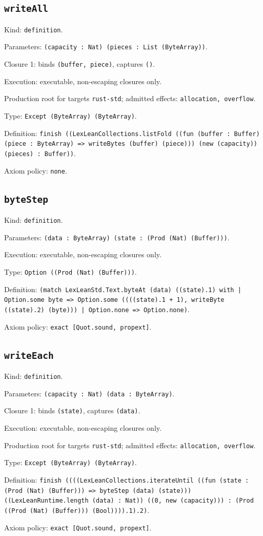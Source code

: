 \documentclass[11pt]{article}
\begin{document}
\subsection*{\texttt{writeAll}}
\noindent Kind: \texttt{definition}.\par
\noindent Parameters: \texttt{(capacity : Nat) (pieces : List (ByteArray))}.\par
\noindent Closure 1: binds \texttt{(buffer, piece)}, captures \texttt{()}.\par
\noindent Execution: executable, non-escaping closures only.\par
\noindent Production root for targets \texttt{rust-std}; admitted effects: \texttt{allocation, overflow}.\par
\noindent Type: \texttt{Except (ByteArray) (ByteArray)}.\par
\noindent Definition: \texttt{finish ((LexLeanCollections.listFold ((fun (buffer : Buffer) (piece : ByteArray) => writeBytes (buffer) (piece))) (new (capacity)) (pieces) : Buffer))}.\par
\noindent Axiom policy: \texttt{none}.\par
\subsection*{\texttt{byteStep}}
\noindent Kind: \texttt{definition}.\par
\noindent Parameters: \texttt{(data : ByteArray) (state : (Prod (Nat) (Buffer)))}.\par
\noindent Execution: executable, non-escaping closures only.\par
\noindent Type: \texttt{Option ((Prod (Nat) (Buffer)))}.\par
\noindent Definition: \texttt{(match LexLeanStd.Text.byteAt (data) ((state).1) with | Option.some byte => Option.some ((((state).1 + 1), writeByte ((state).2) (byte))) | Option.none => Option.none)}.\par
\noindent Axiom policy: \texttt{exact [Quot.sound, propext]}.\par
\subsection*{\texttt{writeEach}}
\noindent Kind: \texttt{definition}.\par
\noindent Parameters: \texttt{(capacity : Nat) (data : ByteArray)}.\par
\noindent Closure 1: binds \texttt{(state)}, captures \texttt{(data)}.\par
\noindent Execution: executable, non-escaping closures only.\par
\noindent Production root for targets \texttt{rust-std}; admitted effects: \texttt{allocation, overflow}.\par
\noindent Type: \texttt{Except (ByteArray) (ByteArray)}.\par
\noindent Definition: \texttt{finish ((((LexLeanCollections.iterateUntil ((fun (state : (Prod (Nat) (Buffer))) => byteStep (data) (state))) ((LexLeanRuntime.length (data) : Nat)) ((0, new (capacity))) : (Prod ((Prod (Nat) (Buffer))) (Bool)))).1).2)}.\par
\noindent Axiom policy: \texttt{exact [Quot.sound, propext]}.\par
\end{document}

